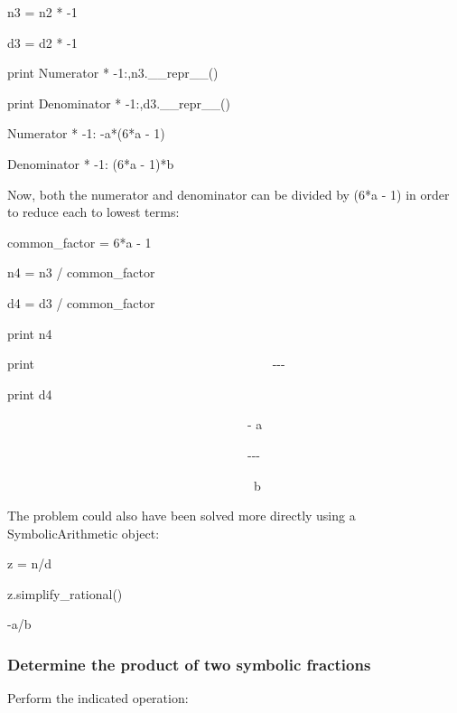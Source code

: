 \documentclass[12pt,oneside]{book}
\begin{document}
n3 = n2 * {}-1

d3 = d2 * {}-1

print {\textquotedbl}Numerator * {}-1:{\textquotedbl},n3.\_\_repr\_\_()

print {\textquotedbl}Denominator * {}-1:{\textquotedbl},d3.\_\_repr\_\_()

{\textbar}

Numerator * {}-1: {}-a*(6*a {}- 1)

Denominator * {}-1: (6*a {}- 1)*b


{\textquotedbl}{\textquotedbl}{\textquotedbl}

Now, both the numerator and denominator can be divided by (6*a {}- 1) in order to reduce each to lowest terms:

{\textquotedbl}{\textquotedbl}{\textquotedbl}

common\_factor = 6*a {}- 1

n4 = n3 / common\_factor

d4 = d3 / common\_factor

print n4

print {\textquotedbl}
\ \ \ \ \ \ \ \ \ \ \ \ \ \ \ \ \ \ \ \ \ \ \ \ \ \ \ \ \ \ \ \ \ \ \ \ \ {}-{}-{}-{\textquotedbl}

print d4

{\textbar}

\ \ \ \ \ \ \ \ \ \ \ \ \ \ \ \ \ \ \ \ \ \ \ \ \ \ \ \ \ \ \ \ \ \ \ \ \ \ {}-
a

\ \ \ \ \ \ \ \ \ \ \ \ \ \ \ \ \ \ \ \ \ \ \ \ \ \ \ \ \ \ \ \ \ \ \ \ \ \ {}-{}-{}-

\ \ \ \ \ \ \ \ \ \ \ \ \ \ \ \ \ \ \ \ \ \ \ \ \ \ \ \ \ \ \ \ \ \ \ \ \ \ \ b


{\textquotedbl}{\textquotedbl}{\textquotedbl}

The problem could also have been solved more directly using a SymbolicArithmetic object:

{\textquotedbl}{\textquotedbl}{\textquotedbl}

z = n/d

z.simplify\_rational()

{\textbar}

{}-a/b


\subsubsection[Determine the product of two symbolic fractions]{Determine the product of two symbolic fractions}

Perform the indicated operation: 
\end{document}
